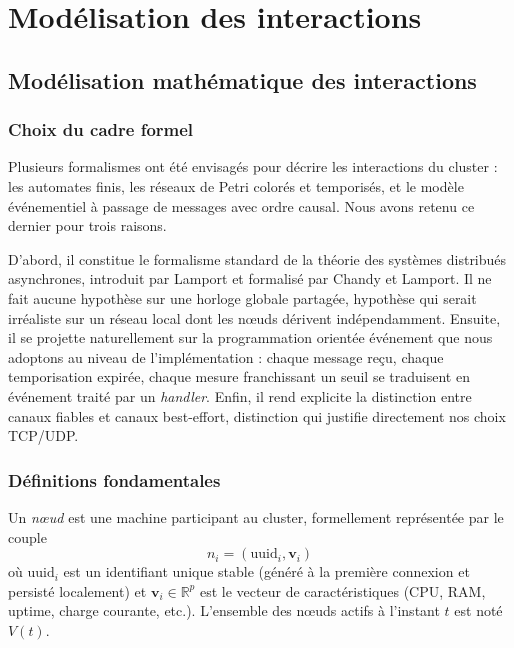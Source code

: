 \section{Modélisation des interactions}

\subsection{Modélisation mathématique des interactions}

\subsubsection{Choix du cadre formel}

Plusieurs formalismes ont été envisagés pour décrire les interactions du cluster : les automates finis, les réseaux de Petri colorés et temporisés, et le modèle événementiel à passage de messages avec ordre causal. Nous avons retenu ce dernier pour trois raisons.

D'abord, il constitue le formalisme standard de la théorie des systèmes distribués asynchrones, introduit par Lamport et formalisé par Chandy et Lamport. Il ne fait aucune hypothèse sur une horloge globale partagée, hypothèse qui serait irréaliste sur un réseau local dont les nœuds dérivent indépendamment. Ensuite, il se projette naturellement sur la programmation orientée événement que nous adoptons au niveau de l'implémentation : chaque message reçu, chaque temporisation expirée, chaque mesure franchissant un seuil se traduisent en événement traité par un \textit{handler}. Enfin, il rend explicite la distinction entre canaux fiables et canaux best-effort, distinction qui justifie directement nos choix TCP/UDP.

\subsubsection{Définitions fondamentales}

\begin{definition}[Nœud]
Un \emph{nœud} est une machine participant au cluster, formellement représentée par le couple
\[
n_i = (\mathrm{uuid}_i, \mathbf{v}_i)
\]
où $\mathrm{uuid}_i$ est un identifiant unique stable (généré à la première connexion et persisté localement) et $\mathbf{v}_i \in \mathbb{R}^p$ est le vecteur de caractéristiques (CPU, RAM, uptime, charge courante, etc.). L'ensemble des nœuds actifs à l'instant $t$ est noté $V(t)$.
\end{definition}

